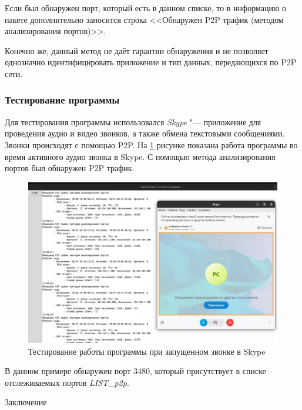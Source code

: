 \documentclass[bachelor, och, coursework]{SCWorks}
\begin{document}
Если был обнаружен порт, который есть в данном списке, то в информацию о пакете дополнительно заносится строка <<Обнаружен P2P трафик (методом анализирования портов)>>.

Конечно же, данный метод не даёт гарантии обнаружения и не позволяет однозначно идентифицировать приложение и тип данных, передающихся по P2P сети.

\subsubsection{Тестирование программы}
Для тестирования программы использовался \textit{Skype} "--- приложение для проведения аудио и видео звонков, а также обмена текстовыми сообщениями. Звонки происходят с помощью P2P. На \ref{ris:test_skype} рисунке показана работа программы во время активного аудио звонка в Skype. С помощью метода анализирования портов был обнаружен P2P трафик.

\begin{figure}[H]
    \centering
    \includegraphics[width=1\textwidth]{test1.jpg}
    \caption{Тестирование работы программы при запущенном звонке в Skype}
    \label{ris:test_skype}
\end{figure}

В данном примере обнаружен порт 3480, который присутствует в списке отслеживаемых портов \textit{LIST_p2p}.


\conclusion
Заключение



\end{document}
